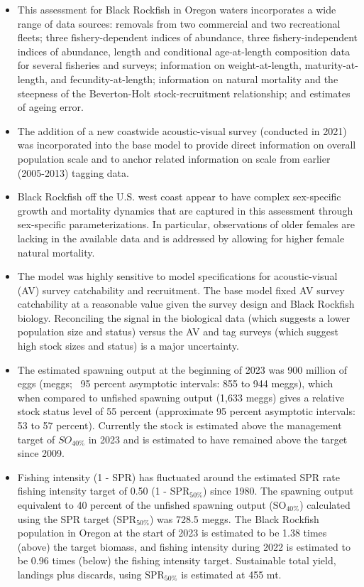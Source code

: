 \documentclass[11pt,
  english,
  letterpaper,
]{article}
\begin{document}
\begin{itemize}

\item This assessment for Black Rockfish in Oregon waters incorporates a wide range of data sources: removals from two commercial and two recreational fleets; three fishery-dependent indices of abundance, three fishery-independent indices of abundance, length and conditional age-at-length composition data for several fisheries and surveys; information on weight-at-length, maturity-at-length, and fecundity-at-length; information on natural mortality and the steepness of the Beverton-Holt stock-recruitment relationship; and estimates of ageing error.

\item The addition of a new coastwide acoustic-visual survey (conducted in 2021) was incorporated into the base model to provide direct information on overall population scale and to anchor related information on scale from earlier (2005-2013) tagging data.   

\item Black Rockfish off the U.S. west coast appear to have complex sex-specific growth and mortality dynamics that are captured in this assessment through sex-specific parameterizations. In particular, observations of older females are lacking in the available data and is addressed by allowing for higher female natural mortality.

\item The model was highly sensitive to model specifications for acoustic-visual (AV) survey catchability and recruitment. The base model fixed AV survey catchability at a reasonable value given the survey design and Black Rockfish biology. Reconciling the signal in the
biological data (which suggests a lower population size and status) versus the AV and tag surveys (which suggest high stock sizes and status) is a major uncertainty.  

\item The estimated spawning output at the beginning of 2023 was 900 million of eggs (meggs; ~95 percent asymptotic intervals: 855 to 944 meggs), which when compared to unfished spawning output (1,633 meggs) gives a relative stock status level of 55 percent (approximate 95 percent asymptotic intervals: 53 to 57 percent).  Currently the stock is estimated above the management target of $SO_{40\%}$ in 2023 and is estimated to have remained above the target since 2009.

\item  Fishing intensity (1 - SPR) has fluctuated around the estimated SPR rate fishing intensity target of 0.50 (1 - $\text{SPR}_{50\%}$) since 1980. The spawning output equivalent to 40 percent of the unfished spawning output ($\text{SO}_{40\%}$) calculated using the SPR target ($\text{SPR}_{50\%}$) was 728.5 meggs. The Black Rockfish population in Oregon at the start of 2023 is estimated to be 1.38 times (above) the target biomass, and fishing intensity during 2022 is estimated to be 0.96 times (below) the fishing intensity target. Sustainable total yield, landings plus discards, using $\text{SPR}_{50\%}$ is estimated at 455 mt.   

\end{itemize}
\end{document}
